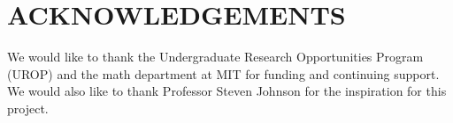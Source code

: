 \documentclass{article}
\begin{document}
\section{ACKNOWLEDGEMENTS}

\begin{comment}


I would like to thank my UROP advisor, Dr. David Spivak, for his guidance, encouragement, and insight in helping me understand and conduct independent research into the pixel array method. I would also like to thank Professor Steven Johnson for the inspiration for this project.

\end{comment}

We would like to thank the Undergraduate Research Opportunities Program (UROP) and the math department at MIT for funding and continuing support. We would also like to thank Professor Steven Johnson for the inspiration for this project.
\end{document}

